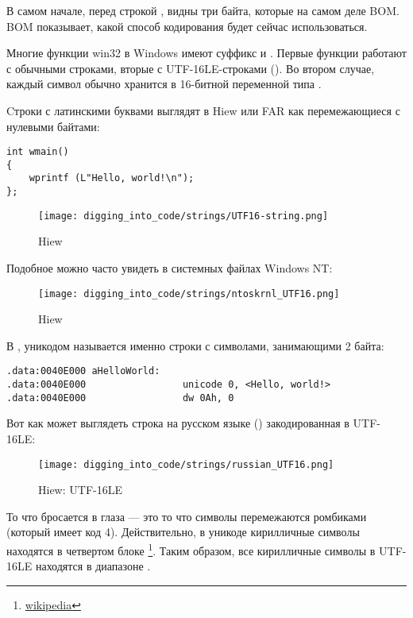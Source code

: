 В самом начале, перед строкой , видны три байта, которые на самом деле \ac{BOM}.
\ac{BOM} показывает, какой способ кодирования будет сейчас использоваться.


Многие функции win32 в Windows имеют суффикс  и .
Первые функции работают с обычными строками, вторые с UTF-16LE-строками ().
Во втором случае, каждый символ обычно хранится в 16-битной переменной типа .

Cтроки с латинскими буквами выглядят в Hiew или FAR как перемежающиеся с нулевыми байтами:

\begin{lstlisting}[style=customc]
int wmain()
{
	wprintf (L"Hello, world!\n");
};
\end{lstlisting}

\begin{figure}[H]
\centering
\texttt{[image: digging\_into\_code/strings/UTF16-string.png]}
\caption{Hiew}
\end{figure}

Подобное можно часто увидеть в системных файлах \gls{Windows NT}:

\begin{figure}[H]
\centering
\texttt{[image: digging\_into\_code/strings/ntoskrnl\_UTF16.png]}
\caption{Hiew}
\end{figure}

В \IDA, уникодом называется именно строки с символами, занимающими 2 байта:

\begin{lstlisting}[style=customasmx86]
.data:0040E000 aHelloWorld:
.data:0040E000                 unicode 0, <Hello, world!>
.data:0040E000                 dw 0Ah, 0
\end{lstlisting}

Вот как может выглядеть строка на русском языке () закодированная в UTF-16LE:

\begin{figure}[H]
\centering
\texttt{[image: digging\_into\_code/strings/russian\_UTF16.png]}
\caption{Hiew: UTF-16LE}
\end{figure}

То что бросается в глаза --- это то что символы перемежаются ромбиками (который имеет код 4).
Действительно, в уникоде кирилличные символы находятся в четвертом блоке
\footnote{\href{http://go.yurichev.com/17003}{wikipedia}}.
Таким образом, все кирилличные символы в UTF-16LE находятся в диапазоне .

